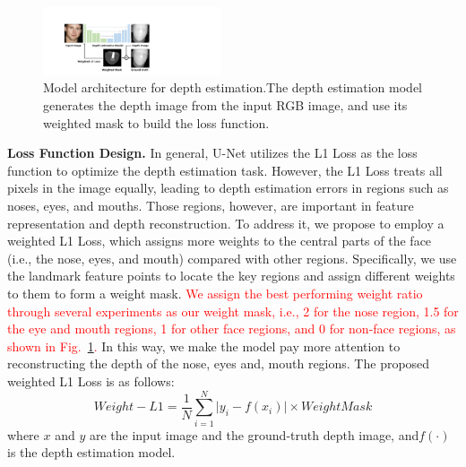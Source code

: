 \begin{figure}[!t]
	\centering
	\includegraphics[width=0.47\textwidth]{figures/model_architecture_1.pdf} 
	\vspace{-0.15in}
	\caption{Model architecture for depth estimation.The depth estimation model generates the depth image from the input RGB image, and use its weighted mask to build the loss function.}
	\label{model_architecture}
	\vspace{-0.15in}
\end{figure}

\textbf{Loss Function Design.} In general, U-Net utilizes the L1 Loss as the loss function to optimize the depth estimation task. However, the L1 Loss treats all pixels in the image equally, leading to depth estimation errors in  regions such as  noses, eyes, and mouths. Those regions, however, are important in feature representation and depth reconstruction.  To address it, we propose to employ a weighted L1 Loss, which assigns more weights to the central parts of the face (i.e., the nose, eyes, and mouth) compared with other regions. Specifically,  we use the landmark feature points to locate the key regions and assign different weights to them to form a weight mask. 
\textcolor{red}{We assign the best performing weight ratio through several experiments as our weight mask, i.e., 2 for the nose region, 1.5 for the eye and mouth regions, 1 for other face regions, and 0 for non-face regions, as shown in Fig.~\ref{model_architecture}.}
In this way, we make the model pay more attention to reconstructing the depth of the nose, eyes and, mouth regions. 
The proposed weighted L1 Loss is as follows:
\begin{equation}
	Weight{-}L1=\frac{1}{N}\sum_{i=1}^{N} \lvert y_i - f(x_i) \rvert \times WeightMask
	\label{weigted_loss}
\end{equation}
where $x$ and $y$ are the input image and the ground-truth depth image,  and$f(\cdot)$ is the depth estimation model.

